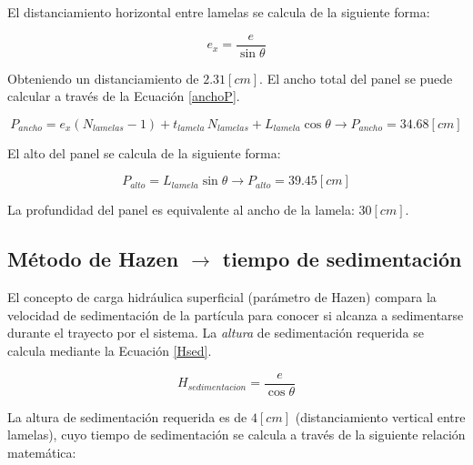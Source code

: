 \noindent
\justify

El distanciamiento horizontal entre lamelas se calcula de la siguiente forma:

\begin{equation}
	e_x = \frac{e}{\sin \theta}
\end{equation}

\noindent
\justify

Obteniendo un distanciamiento de $2.31 [cm]$. El ancho total del panel se puede calcular a trav\'es de la Ecuaci\'on \ref{anchoP}.

\begin{equation}
	P_{ancho} = e_x (N_{lamelas}-1) + t_{lamela} \, N_{lamelas} + L_{lamela} \cos \theta \rightarrow P_{ancho} = 34.68 [cm]
	\label{anchoP}
\end{equation}

\noindent
\justify

El alto del panel se calcula de la siguiente forma:

\begin{equation}
	P_{alto} = L_{lamela} \sin \theta \rightarrow P_{alto} = 39.45 [cm]
\end{equation}

\noindent
\justify

La profundidad del panel es equivalente al ancho de la lamela: $30 [cm]$.


\subsection{M\'etodo de Hazen $\rightarrow$ tiempo de sedimentaci\'on}

\noindent
\justify

El concepto de carga hidr\'aulica superficial (par\'ametro de Hazen) compara la velocidad de sedimentaci\'on de la part\'icula para conocer si alcanza a sedimentarse durante el trayecto por el sistema. La \textit{altura} de sedimentaci\'on requerida se calcula mediante la Ecuaci\'on \ref{Hsed}.

\begin{equation}
	H_{sedimentacion} = \frac{e}{\cos \theta}
	\label{Hsed}
\end{equation} 

\noindent
\justify

La altura de sedimentaci\'on requerida es de $4 [cm]$ (distanciamiento vertical entre lamelas), cuyo tiempo de sedimentaci\'on se calcula a trav\'es de la siguiente relaci\'on matem\'atica:

